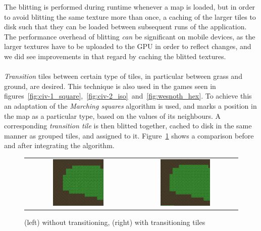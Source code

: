 The blitting is performed during runtime whenever a map is loaded, but in order to avoid blitting the same texture more than once, a caching of the larger tiles to disk such that they can be loaded between subsequent runs of the application. 
The performance overhead of blitting \textit{can} be significant on mobile devices, as the larger textures have to be uploaded to the GPU in order to reflect changes, and we did see improvements in that regard by caching the blitted textures.
\\
\\
\textit{Transition} tiles between certain type of tiles, in particular between grass and ground, are desired.
This technique is also used in the games seen in figures~\ref{fig:civ-1_square},~\ref{fig:civ-2_iso}~and~\ref{fig:wesnoth_hex}.
To achieve this an adaptation of the \textit{Marching squares} algorithm is used, and marks a position in the map as a particular type, based on the values  of its neighbours. 
A corresponding \textit{transition tile} is then blitted together, cached to disk in the same manner as grouped tiles, and assigned to it.
Figure~\ref{fig:transition_comparison} shows a comparison before and after integrating the algorithm.

\begin{figure}[H]
    \centering
    \begin{tabular}{cc}
        \includegraphics[width=0.5\textwidth]{figures/generating_levels/no_transition.png}
        &
        \includegraphics[width=0.5\textwidth]{figures/generating_levels/with_transition.png}
    \end{tabular}
    \caption{(left) without transitioning, (right) with transitioning tiles}\label{fig:transition_comparison}
\end{figure}

